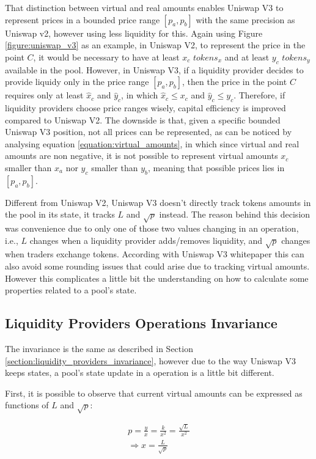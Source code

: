 \documentclass{article}
\begin{document}
That distinction between virtual and real amounts enables Uniswap V3 to represent prices in a bounded price range $[p_a, p_b]$ with the same precision as Uniswap v2, however using less liquidity for this.
Again using Figure \ref{figure:uniswap_v3} as an example, in Uniswap V2, to represent the price in the point $C$, it would be necessary to have at least $x_c$ $tokens_x$ and at least $y_c$ $tokens_y$ available in the pool.
However, in Uniswap V3, if a liquidity provider decides to provide liquidy only in the price range $[p_a, p_b]$, then the price in the point $C$ requires only at least $\hat{x}_c$ and $\hat{y}_c$, in which $\hat{x}_c \leq x_c$ and $\hat{y}_c \leq y_c$.
Therefore, if liquidity providers choose price ranges wisely, capital efficiency is improved compared to Uniswap V2.
The downside is that, given a specific bounded Uniswap V3 position, not all prices can be represented, as can be noticed by analysing equation \ref{equation:virtual_amounts}, in which since virtual and real amounts are non negative, it is not possible to represent virtual amounts $x_c$ smaller than $x_a$ nor $y_c$ smaller than $y_b$, meaning that possible prices lies in $[p_a, p_b]$.

Different from Uniswap V2, Uniswap V3 doesn't directly track tokens amounts in the pool in its state, it tracks $L$ and $\sqrt{p}$ instead.
The reason behind this decision was convenience due to only one of those two values changing in an operation, i.e., $L$ changes when a liquidity provider adds/removes liquidity, and $\sqrt{p}$ changes when traders exchange tokens.
According with Uniswap V3 whitepaper this can also avoid some rounding issues that could arise due to tracking virtual amounts.
However this complicates a little bit the understanding on how to calculate some properties related to a pool's state.

\subsection{Liquidity Providers Operations Invariance}

The invariance is the same as described in Section \ref{section:liquidity_providers_invariance}, however due to the way Uniswap V3 keeps states, a pool's state update in a operation is a little bit different.

First, it is possible to observe that current virtual amounts can be expressed as functions of $L$ and $\sqrt{p}$:

\begin{equation}
    \label{equation:x}
    \begin{split}
        p=\frac{y}{x}=\frac{k}{x^2}=\frac{\sqrt{L}}{x^2} \\
        \Rightarrow x=\frac{L}{\sqrt{p}}
    \end{split}
\end{equation}
\end{document}
